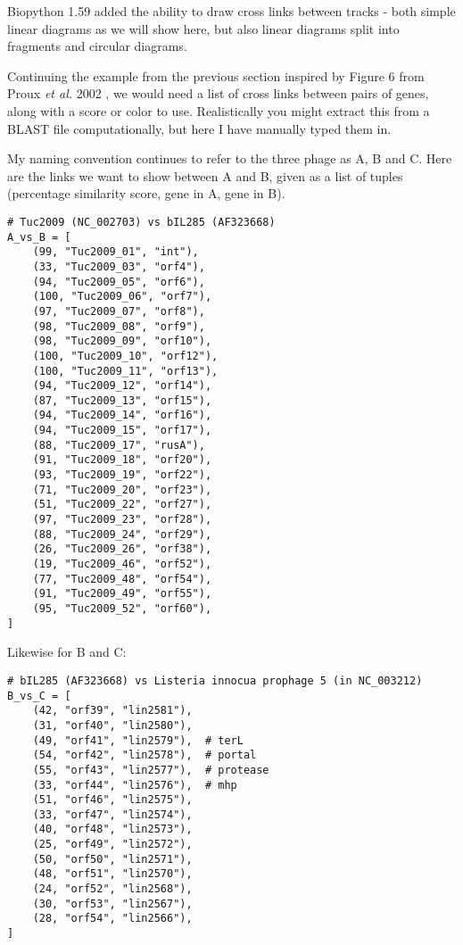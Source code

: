 Biopython 1.59 added the ability to draw cross links between tracks - both
simple linear diagrams as we will show here, but also linear diagrams split
into fragments and circular diagrams.

Continuing the example from the previous section inspired by Figure 6 from
Proux \textit{et al.} 2002 \cite{proux2002},
we would need a list of cross links between pairs of genes, along with a score
or color to use. Realistically you might extract this from a BLAST file
computationally, but here I have manually typed them in.

My naming convention continues to refer to the three phage as A, B and C.
Here are the links we want to show between A and B, given as a list of
tuples (percentage similarity score, gene in A, gene in B).

\begin{verbatim}
# Tuc2009 (NC_002703) vs bIL285 (AF323668)
A_vs_B = [
    (99, "Tuc2009_01", "int"),
    (33, "Tuc2009_03", "orf4"),
    (94, "Tuc2009_05", "orf6"),
    (100, "Tuc2009_06", "orf7"),
    (97, "Tuc2009_07", "orf8"),
    (98, "Tuc2009_08", "orf9"),
    (98, "Tuc2009_09", "orf10"),
    (100, "Tuc2009_10", "orf12"),
    (100, "Tuc2009_11", "orf13"),
    (94, "Tuc2009_12", "orf14"),
    (87, "Tuc2009_13", "orf15"),
    (94, "Tuc2009_14", "orf16"),
    (94, "Tuc2009_15", "orf17"),
    (88, "Tuc2009_17", "rusA"),
    (91, "Tuc2009_18", "orf20"),
    (93, "Tuc2009_19", "orf22"),
    (71, "Tuc2009_20", "orf23"),
    (51, "Tuc2009_22", "orf27"),
    (97, "Tuc2009_23", "orf28"),
    (88, "Tuc2009_24", "orf29"),
    (26, "Tuc2009_26", "orf38"),
    (19, "Tuc2009_46", "orf52"),
    (77, "Tuc2009_48", "orf54"),
    (91, "Tuc2009_49", "orf55"),
    (95, "Tuc2009_52", "orf60"),
]
\end{verbatim}

Likewise for B and C:

\begin{verbatim}
# bIL285 (AF323668) vs Listeria innocua prophage 5 (in NC_003212)
B_vs_C = [
    (42, "orf39", "lin2581"),
    (31, "orf40", "lin2580"),
    (49, "orf41", "lin2579"),  # terL
    (54, "orf42", "lin2578"),  # portal
    (55, "orf43", "lin2577"),  # protease
    (33, "orf44", "lin2576"),  # mhp
    (51, "orf46", "lin2575"),
    (33, "orf47", "lin2574"),
    (40, "orf48", "lin2573"),
    (25, "orf49", "lin2572"),
    (50, "orf50", "lin2571"),
    (48, "orf51", "lin2570"),
    (24, "orf52", "lin2568"),
    (30, "orf53", "lin2567"),
    (28, "orf54", "lin2566"),
]
\end{verbatim}

